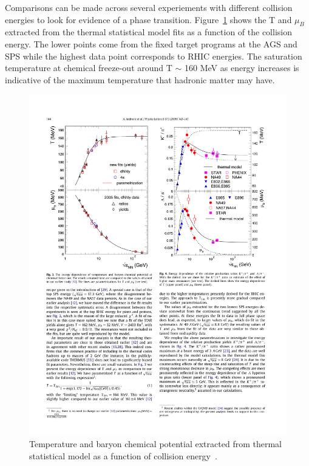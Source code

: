 Comparisons can be made across several experiements with different collision energies to look for evidence of a phase transition. Figure~\ref{fig:T_mu} shows the T and $\mu_B$ extracted from the thermal statistical model fits as a function of the collision energy. The lower points come from the fixed target programs at the AGS and SPS while the highest data point corresponds to RHIC energies. The saturation temperature at chemical freeze-out around T $\sim$ 160 MeV as energy increases is indicative of the maximum temperature that hadronic matter may have.

\begin{figure}[htbp]
\begin{center}
\includegraphics[scale=1.3]{Plots/Intro/freezeout.pdf}
\end{center}
\caption[Freeze-out T and $\mu_B$]{Temperature and baryon chemical potential extracted from thermal statistical model as a function of collision energy~\cite{thermstat}.}
\label{fig:T_mu}
\end{figure}

